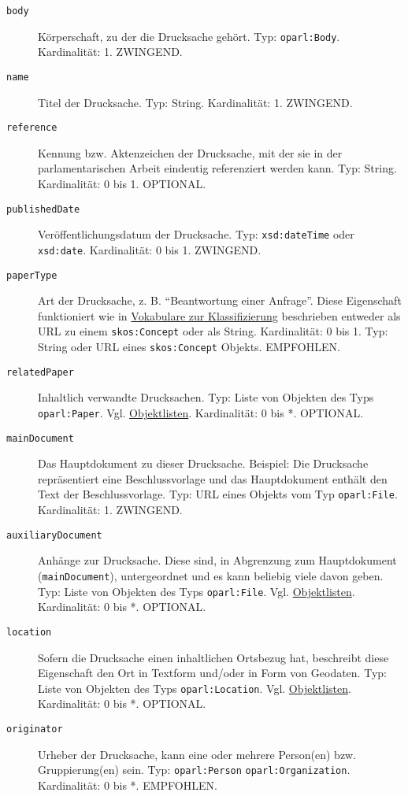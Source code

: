 \documentclass[,a4paper]{article}
\begin{document}
\begin{description}
\item[\texttt{body}]
Körperschaft, zu der die Drucksache gehört. Typ: \texttt{oparl:Body}.
Kardinalität: 1. ZWINGEND.
\item[\texttt{name}]
Titel der Drucksache. Typ: String. Kardinalität: 1. ZWINGEND.
\item[\texttt{reference}]
Kennung bzw. Aktenzeichen der Drucksache, mit der sie in der
parlamentarischen Arbeit eindeutig referenziert werden kann. Typ:
String. Kardinalität: 0 bis 1. OPTIONAL.
\item[\texttt{publishedDate}]
Veröffentlichungsdatum der Drucksache. Typ: \texttt{xsd:dateTime} oder
\texttt{xsd:date}. Kardinalität: 0 bis 1. ZWINGEND.
\item[\texttt{paperType}]
Art der Drucksache, z. B. ``Beantwortung einer Anfrage''. Diese
Eigenschaft funktioniert wie in
\hyperref[vokabulareux5fklassifizierung]{Vokabulare zur Klassifizierung}
beschrieben entweder als URL zu einem \texttt{skos:Concept} oder als
String. Kardinalität: 0 bis 1. Typ: String oder URL eines
\texttt{skos:Concept} Objekts. EMPFOHLEN.
\item[\texttt{relatedPaper}]
Inhaltlich verwandte Drucksachen. Typ: Liste von Objekten des Typs
\texttt{oparl:Paper}. Vgl. \hyperref[objektlisten]{Objektlisten}.
Kardinalität: 0 bis *. OPTIONAL.
\item[\texttt{mainDocument}]
Das Hauptdokument zu dieser Drucksache. Beispiel: Die Drucksache
repräsentiert eine Beschlussvorlage und das Hauptdokument enthält den
Text der Beschlussvorlage. Typ: URL eines Objekts vom Typ
\texttt{oparl:File}. Kardinalität: 1. ZWINGEND.
\item[\texttt{auxiliaryDocument}]
Anhänge zur Drucksache. Diese sind, in Abgrenzung zum Hauptdokument
(\texttt{mainDocument}), untergeordnet und es kann beliebig viele davon
geben. Typ: Liste von Objekten des Typs \texttt{oparl:File}. Vgl.
\hyperref[objektlisten]{Objektlisten}. Kardinalität: 0 bis *. OPTIONAL.
\item[\texttt{location}]
Sofern die Drucksache einen inhaltlichen Ortsbezug hat, beschreibt diese
Eigenschaft den Ort in Textform und/oder in Form von Geodaten. Typ:
Liste von Objekten des Typs \texttt{oparl:Location}. Vgl.
\hyperref[objektlisten]{Objektlisten}. Kardinalität: 0 bis *. OPTIONAL.
\item[\texttt{originator}]
Urheber der Drucksache, kann eine oder mehrere Person(en) bzw.
Gruppierung(en) sein. Typ: \texttt{oparl:Person} \textbar{}
\texttt{oparl:Organization}. Kardinalität: 0 bis *. EMPFOHLEN.

\end{description}
\end{document}
